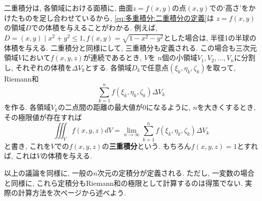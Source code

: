         二重積分は, 各領域における面積に, 曲面$z=f(x,y)$の点$(x,y)$での`高さ'をかけたものを足し合わせているから, \eqref{eq:多重積分:二重積分の定義}は
        $z=f(x,y)$の領域$D$での体積を与えることがわかる. 例えば, $D={(x,y)\mid x^2+y^2\leq 1},f(x,y)=\sqrt{1-x^2-y^2}$とした場合は, 
        半径1の半球の体積を与える.
        \clearpage
        二重積分と同様にして, 三重積分も定義される. この場合も三次元領域$V$において$f(x,y,z)$が連続であるとき, $V$を
        $n$個の小領域$V_1,V_2,\dots,V_n$に分割し, それぞれの体積を$\Delta V_k$とする. 各領域$D_k$で任意点$(\xi_k,\eta_k,\zeta_k)$を取って, Riemann和
        \begin{equation}
            \sum_{k=1}^nf(\xi_k,\eta_k,\zeta_k)\Delta V_k
        \end{equation} 
        を作る. 各領域$V_k$の二点間の距離の最大値が0になるように, $n$を大きくするとき, その極限値が存在すれば
        \begin{equation}
            \iiint_Vf(x,y,z)dV=\lim_{n\to\infty}\sum_{k=1}^nf(\xi_k,\eta_k,\zeta_k)\Delta V_k
        \end{equation}
        と書き, これを$V$での$f(x,y,z)$の\textbf{三重積分}という. もちろん$f(x,y,z)=1$とすれば, 
        これは$V$の体積を与える.

        以上の議論を同様に, 一般の$n$次元の定積分が定義される. ただし, 一変数の場合と同様に, これら定積分もRiemann和の極限として計算するのは得策でない.
        実際の計算方法を次ページから述べよう.
    \clearpage
